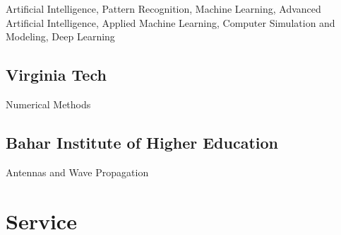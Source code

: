\documentclass[11pt,letterpaper]{report}
\newcommand{\listitemspace}{0.25em}
\renewenvironment{itemize}
{\begin{list}{}{\setlength{\leftmargin}{0em}
                \setlength{\parskip}{0em}
                \setlength{\itemsep}{\listitemspace}
                \setlength{\parsep}{\listitemspace}}}
{\end{list}}
\begin{document}
    \begin{itemize}

        \item Artificial Intelligence, Pattern Recognition, Machine Learning, Advanced Artificial Intelligence, Applied Machine Learning, Computer Simulation and Modeling, Deep Learning
    \end{itemize}

    \subsection*{Virginia Tech}
    \begin{itemize}
        \item Numerical Methods
    \end{itemize}

    \subsection*{Bahar Institute of Higher Education}
    \begin{itemize}
        \item Antennas and Wave Propagation
    \end{itemize}

    \section*{Service}







\end{document}
